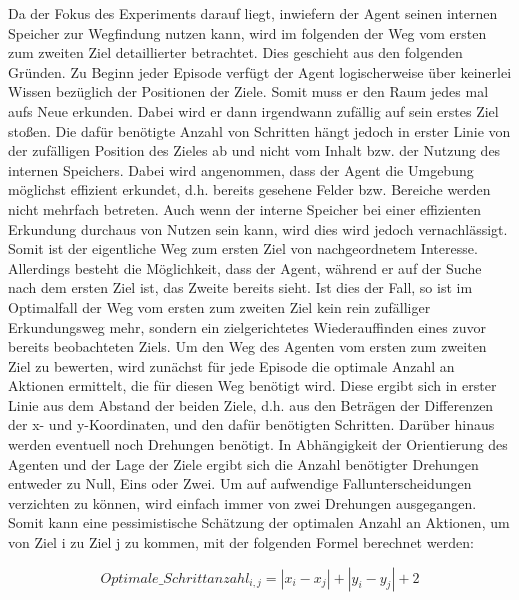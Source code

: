 Da der Fokus des Experiments darauf liegt, inwiefern der Agent seinen internen Speicher zur Wegfindung nutzen kann, wird im folgenden der Weg vom ersten zum zweiten Ziel detaillierter betrachtet. Dies geschieht aus den folgenden Gründen. Zu Beginn jeder Episode verfügt der Agent logischerweise über keinerlei Wissen bezüglich der Positionen der Ziele. Somit muss er den Raum jedes mal aufs Neue erkunden. Dabei wird er dann irgendwann zufällig auf sein erstes Ziel stoßen. Die dafür benötigte Anzahl von Schritten hängt jedoch in erster Linie von der zufälligen Position des Zieles ab und nicht vom Inhalt bzw. der Nutzung des internen Speichers. Dabei wird angenommen, dass der Agent die Umgebung möglichst effizient erkundet, d.h. bereits gesehene Felder bzw. Bereiche werden nicht mehrfach betreten. Auch wenn der interne Speicher bei einer effizienten Erkundung durchaus von Nutzen sein kann, wird dies wird jedoch vernachlässigt. Somit ist der eigentliche Weg zum ersten Ziel von nachgeordnetem Interesse. Allerdings besteht die Möglichkeit, dass der Agent, während er auf der Suche nach dem ersten Ziel ist, das Zweite bereits sieht. Ist dies der Fall, so ist im Optimalfall der Weg vom ersten zum zweiten Ziel kein rein zufälliger Erkundungsweg mehr, sondern ein zielgerichtetes Wiederauffinden eines zuvor bereits beobachteten Ziels. Um den Weg des Agenten vom ersten zum zweiten Ziel zu bewerten, wird zunächst für jede Episode die optimale Anzahl an Aktionen ermittelt, die für diesen Weg benötigt wird. Diese ergibt sich in erster Linie aus dem Abstand der beiden Ziele, d.h. aus den Beträgen der Differenzen der x- und y-Koordinaten, und den dafür benötigten Schritten. Darüber hinaus werden eventuell noch Drehungen benötigt. In Abhängigkeit der Orientierung des Agenten und der Lage der Ziele ergibt sich die Anzahl benötigter Drehungen entweder zu Null, Eins oder Zwei. Um auf aufwendige Fallunterscheidungen verzichten zu können, wird einfach immer von zwei Drehungen ausgegangen. Somit kann eine pessimistische Schätzung der optimalen Anzahl an Aktionen, um von Ziel i zu Ziel j zu kommen, mit der folgenden Formel berechnet werden:

\begin{equation}
  Optimale\_Schrittanzahl_{i,j} = |x_i - x_j| + |y_i - y_j| + 2
  \label{opt_steps_i_to_j}
\end{equation}

